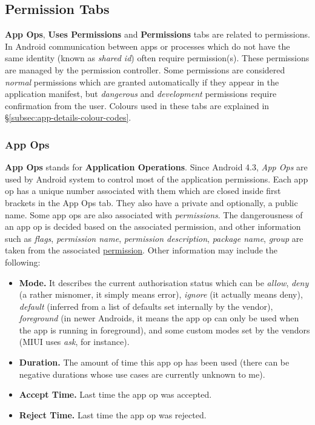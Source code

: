 \subsection{Permission Tabs}\label{subsec:permission-tabs} %
\textbf{App Ops}, \textbf{Uses Permissions} and \textbf{Permissions} tabs are related to permissions. In Android
communication between apps or processes which do not have the same identity (known as \textit{shared id}) often require
permission(s). These permissions are managed by the permission controller. Some permissions are considered
\textit{normal} permissions which are granted automatically if they appear in the application manifest, but
\textit{dangerous} and \textit{development} permissions require confirmation from the user. Colours used in these tabs
are explained in §\cref{subsec:app-details-colour-codes}.

\subsubsection{App Ops}\label{subsubsec:app-ops} %
\textbf{App Ops} stands for \textbf{Application Operations}.
Since Android 4.3, \textit{App Ops} are used by Android system to control most of the application permissions.
Each app op has a unique number associated with them which are closed inside first brackets in the App Ops tab.
They also have a private and optionally, a public name.
Some app ops are also associated with \textit{permissions}.
The dangerousness of an app op is decided based on the associated permission, and other information such as
\textit{flags}, \textit{permission name}, \textit{permission description}, \textit{package name}, \textit{group} are
taken from the associated \hyperref[subsubsec:permissions]{permission}.
Other information may include the following:
\begin{itemize}
    \item \textbf{Mode.} It describes the current authorisation status which can be \textit{allow}, \textit{deny} (a
    rather misnomer, it simply means error), \textit{ignore} (it actually means deny), \textit{default} (inferred from
    a list of defaults set internally by the vendor), \textit{foreground} (in newer Androids, it means the app op can
    only be used when the app is running in foreground), and some custom modes set by the vendors (MIUI uses
    \textit{ask}, for instance).

    \item \textbf{Duration.} The amount of time this app op has been used (there can be negative durations whose use
    cases are currently unknown to me).

    \item \textbf{Accept Time.} Last time the app op was accepted.

    \item \textbf{Reject Time.} Last time the app op was rejected.
\end{itemize}

